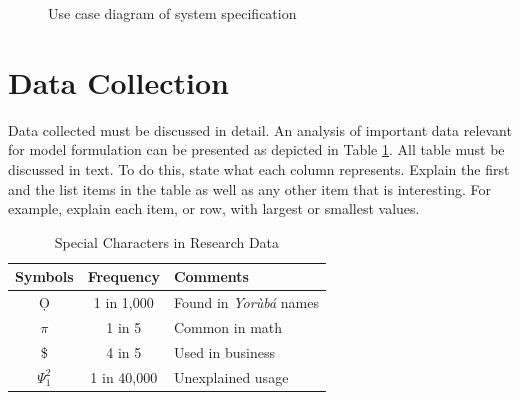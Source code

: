 \begin{figure}[!h]
	\centering
	\caption{Use case diagram of system specification}
	\label{usecase}
\end{figure}





\section{Data Collection}
Data collected must be discussed in detail. An analysis of important data relevant for model formulation can be presented as depicted in Table \ref{tab-freq}. All table must be discussed in text. To do this, state what each column represents. Explain the first and the list items in the table as well as any other item that is interesting. For example, explain each item, or row, with largest or smallest values.

\begin{table}[!h]
	\caption{Special Characters in Research Data}
	\label{tab-freq}
	\centering
	\begin{tabular}{ccl}
		\hline \hline
		Symbols & Frequency & Comments\\
		\hline
		\d{O} & 1 in 1,000 & Found in \textit{Yor\`ub\'a}  names\\
		$\pi$ & 1 in 5 & Common in math\\
		\$ & 4 in 5 & Used in business\\
		$\Psi^2_1$ & 1 in 40,000 & Unexplained usage\\
		\hline\hline 
	\end{tabular}
\end{table}


